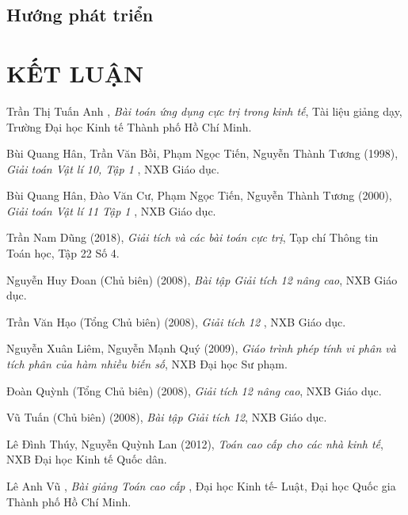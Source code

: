 \documentclass[12pt,a4paper,oneside]{book}
\begin{document}
\section{Hướng phát triển}

\chapter*{KẾT LUẬN}




\newpage
\renewcommand{\bibname}{\bf \LARGE \quad DANH MỤC TÀI LIỆU THAM KHẢO}
\baselineskip
18pt
\begin{thebibliography}{99}
	
	 Trần Thị Tuấn Anh , \textit{Bài toán ứng dụng cực trị trong kinh tế}, Tài liệu giảng dạy, Trường Đại học Kinh tế Thành phố Hồ Chí Minh.
	
	 Bùi Quang Hân, Trần Văn Bồi, Phạm Ngọc Tiến, Nguyễn Thành Tương (1998), \textit{Giải toán Vật lí 10, Tập 1 }, NXB Giáo dục.
		
	 Bùi Quang Hân, Đào Văn Cư, Phạm Ngọc Tiến, Nguyễn Thành Tương (2000), \textit{Giải toán Vật lí 11 Tập 1 }, NXB Giáo dục.
		

		
	 Trần Nam Dũng (2018), \textit{Giải tích và các bài toán cực trị}, Tạp chí Thông tin Toán học, Tập 22 Số 4.
	
	 Nguyễn Huy Đoan (Chủ biên) (2008), \textit{Bài tập Giải tích 12 nâng cao}, NXB Giáo dục.
	
	 Trần Văn Hạo (Tổng Chủ biên) (2008), \textit{Giải tích 12 }, NXB Giáo dục.	
	
	  Nguyễn Xuân Liêm, Nguyễn Mạnh Quý (2009), \textit{Giáo trình phép tính vi phân và tích phân của hàm nhiều biến số}, NXB Đại học Sư phạm.
	
	 Đoàn Quỳnh (Tổng Chủ biên) (2008), \textit{Giải tích 12 nâng cao}, NXB Giáo dục.
	
	 Vũ Tuấn (Chủ biên) (2008), \textit{Bài tập Giải tích 12}, NXB Giáo dục.
	
	 Lê Đình Thúy, Nguyễn Quỳnh Lan (2012), \textit{Toán cao cấp cho các nhà kinh tế},  NXB Đại học Kinh tế Quốc dân.
	
	 Lê Anh Vũ , \textit{Bài giảng Toán cao cấp }, Đại học Kinh tế- Luật, Đại học Quốc gia Thành phố Hồ Chí Minh.
\end{thebibliography}
\end{document}
